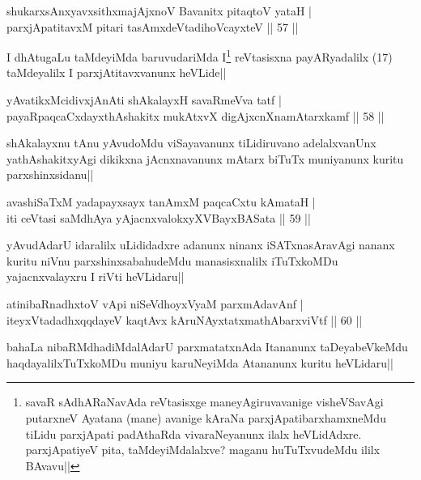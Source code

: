 \begin{shl}
shukarxsAnxyavxsithxmajAjxnoV Bavanitx pitaqtoV yataH |\\
parxjApatitavxM pitari tasAmxdeVtadihoVcayxteV \hfill || 57 ||
\end{shl}

\begin{artha}%
\stext I dhAtugaLu taMdeyiMda baruvudariMda I\footnote[1]{savaR sAdhARaNavAda reVtasisxge maneyAgiruvavanige visheVSavAgi putarxneV Ayatana (mane) avanige kAraNa parxjApatibarxhamxneMdu tiLidu parxjApati padAthaRda vivaraNeyanunx ilalx heVLidAdxre. parxjApatiyeV pita, taMdeyiMdalalxve? maganu huTuTxvudeMdu ililx BAvavu||} reVtasisxna payARyadalilx (17) taMdeyalilx I parxjAtitavxvanunx heVLide||
\end{artha}

\begin{shl}
yAvatikxMcidivxjAnAti shAkalayxH savaRmeVva tatf |\\
payaRpaqcaCxdayxthAshakitx mukAtxvX digAjxcnXnamAtarxkamf \hfill || 58 ||
\end{shl}

\begin{artha}
shAkalayxnu tAnu yAvudoMdu viSayavanunx tiLidiruvano adelalxvanUnx yathAshakitxyAgi dikikxna jAcnxnavanunx mAtarx biTuTx muniyanunx kuritu parxshinxsidanu||
\end{artha}

\begin{shl}
avashiSaTxM yadapayxsayx tanAmxM paqcaCxtu kAmataH |\\
iti ceVtasi saMdhAya yAjacnxvalokxyXV\s BayxBASata \hfill || 59 ||
\end{shl}

\begin{artha}
yAvudAdarU idaralilx uLididadxre adanunx ninanx iSATxnasAravAgi nananx kuritu niVnu parxshinxsabahudeMdu manasisxnalilx iTuTxkoMDu yajacnxvalayxru I riVti heVLidaru||
\end{artha}

\begin{shl}
atinibaRnadhxtoV vA\s pi niSeVdhoyxV\s yaM parxmAdavAnf |\\
iteyxVtadadhxqqdayeV kaqtAvx kAruNAyxtatxmathAbarxviVtf \hfill || 60 ||
\end{shl}

\begin{artha}
bahaLa nibaRMdhadiMdalAdarU parxmatatxnAda Itananunx taDeyabeVkeMdu haqdayalilxTuTxkoMDu muniyu karuNeyiMda Atananunx kuritu heVLidaru||
\end{artha}%

